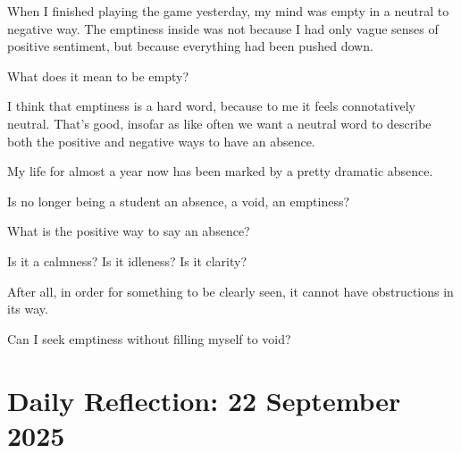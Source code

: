 \documentclass[12pt]{article}
\renewcommand{\,}{\textsuperscript{,}}
\begin{document}
When I finished playing the game yesterday, my mind was empty in a neutral to negative way.
The emptiness inside was not because I had only vague senses of positive sentiment, but because everything had been pushed down.

What does it mean to be empty?

I think that emptiness is a hard word, because to me it feels connotatively neutral.
That's good, insofar as like often we want a neutral word to describe both the positive and negative ways to have an absence.

My life for almost a year now has been marked by a pretty dramatic absence.

Is no longer being a student an absence, a void, an emptiness?

What is the positive way to say an absence?

Is it a calmness?
Is it idleness?
Is it clarity?

After all, in order for something to be clearly seen, it cannot have obstructions in its way.

Can I seek emptiness without filling myself to void?

\section{Daily Reflection: 22 September 2025}
\end{document}
